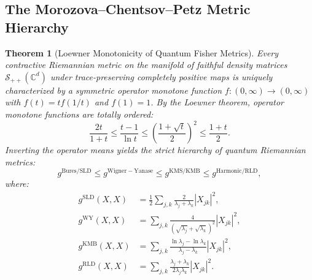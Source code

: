 \documentclass[11pt,a4paper]{article}
\theoremstyle{plain}
\newtheorem{theorem}{Theorem}[section]
\theoremstyle{definition}
\begin{document}
\subsection{The Morozova--Chentsov--Petz Metric Hierarchy}
\begin{theorem}[Loewner Monotonicity of Quantum Fisher Metrics]
\label{thm:loewner_hierarchy}
Every contractive Riemannian metric on the manifold of faithful density matrices $\mathcal{S}_{++}(\mathbb{C}^d)$ under trace-preserving completely positive maps is uniquely characterized by a symmetric operator monotone function $f: (0, \infty) \to (0, \infty)$ with $f(t) = t f(1/t)$ and $f(1) = 1$. By the Loewner theorem, operator monotone functions are totally ordered:
\begin{equation}
\frac{2t}{1+t} \le \frac{t-1}{\ln t} \le \left(\frac{1+\sqrt{t}}{2}\right)^2 \le \frac{1+t}{2}.
\end{equation}
Inverting the operator means yields the strict hierarchy of quantum Riemannian metrics:
\begin{equation}
g^{\mathrm{Bures/SLD}} \le g^{\mathrm{Wigner-Yanase}} \le g^{\mathrm{KMS/KMB}} \le g^{\mathrm{Harmonic/RLD}},
\end{equation}
where:
\begin{align}
g^{\mathrm{SLD}}(X, X) &= \frac{1}{2} \sum_{j,k} \frac{2}{\lambda_j + \lambda_k} |X_{jk}|^2, \\
g^{\mathrm{WY}}(X, X) &= \sum_{j,k} \frac{4}{(\sqrt{\lambda_j} + \sqrt{\lambda_k})^2} |X_{jk}|^2, \\
g^{\mathrm{KMB}}(X, X) &= \sum_{j,k} \frac{\ln\lambda_j - \ln\lambda_k}{\lambda_j - \lambda_k} |X_{jk}|^2, \\
g^{\mathrm{RLD}}(X, X) &= \sum_{j,k} \frac{\lambda_j + \lambda_k}{2 \lambda_j \lambda_k} |X_{jk}|^2.
\end{align}
\end{theorem}
\end{document}
